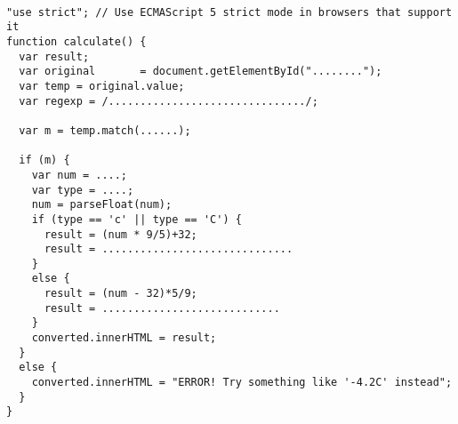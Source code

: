 

  \begin{latexonly}
    \begin{verbatim}

"use strict"; // Use ECMAScript 5 strict mode in browsers that support it
function calculate() {
  var result;
  var original       = document.getElementById("........");
  var temp = original.value;
  var regexp = /.............................../;
  
  var m = temp.match(......);
  
  if (m) {
    var num = ....;
    var type = ....;
    num = parseFloat(num);
    if (type == 'c' || type == 'C') {
      result = (num * 9/5)+32;
      result = ..............................
    }
    else {
      result = (num - 32)*5/9;
      result = ............................
    }
    converted.innerHTML = result;
  }
  else {
    converted.innerHTML = "ERROR! Try something like '-4.2C' instead";
  }
}

    \end{verbatim}
  \end{latexonly}
